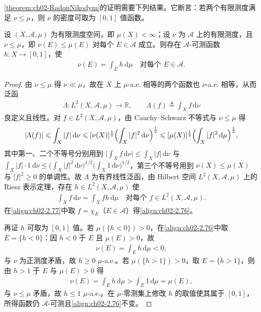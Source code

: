 \documentclass[../../main.tex]{subfiles}%
\begin{document}
\cref{theorem:ch02-RadonNikodym}的证明需要下列结果。它断言：若两个有限测度满足 $\nu\leqslant\mu$，则 $\nu$ 的密度可取为 $[0,1]$ 值函数。

\begin{lemma}\label{lemma:ch02-vonNeumann}
设 $(X,\mathscr A,\mu)$ 为有限测度空间，即 $\mu(X)<\infty$；设 $\nu$ 为 $\mathscr A$ 上的有限测度，且 $\nu\leqslant\mu$，即 $\nu(E)\leqslant\mu(E)$ 对每个 $E\in\mathscr A$ 成立。则存在 $\mathscr A$-可测函数 $h:X\to[0,1]$，使
\begin{align}
\nu(E)=\int_Eh\,\mathrm{d}\mu\quad\text{对每个 }E\in\mathscr A. \label{align:ch02-2.76}
\end{align}
\end{lemma}

\begin{proof}
由 $\nu\leqslant\mu$ 得 $\nu\ll\mu$，故在 $X$ 上 $\mu$-a.e. 相等的两个函数也 $\nu$-a.e. 相等，从而泛函
\begin{align*}
\Lambda:L^2(X,\mathscr A,\mu)\to\mathbb R,\qquad\Lambda(f)\triangleq\int_Xf\,\mathrm{d}\nu
\end{align*}
良定义且线性。对 $f\in L^2(X,\mathscr A,\mu)$，由 Cauchy--Schwarz 不等式与 $\nu\leqslant\mu$ 得
\begin{align*}
|\Lambda(f)|\leqslant\int_X|f|\,\mathrm{d}\nu\leqslant[\nu(X)]^{\frac12}\Bigl(\int_X|f|^2\,\mathrm{d}\nu\Bigr)^{\frac12}\leqslant[\mu(X)]^{\frac12}\Bigl(\int_X|f|^2\,\mathrm{d}\mu\Bigr)^{\frac12},
\end{align*}
其中第一、二个不等号分别用到 $\bigl|\int_Xf\,\mathrm{d}\nu\bigr|\leqslant\int_X|f|\,\mathrm{d}\nu$ 与 $\int_X|f|\cdot1\,\mathrm{d}\nu\leqslant\bigl(\int_X|f|^2\,\mathrm{d}\nu\bigr)^{1/2}\bigl(\int_X1\,\mathrm{d}\nu\bigr)^{1/2}$，第三个不等号用到 $\nu(X)\leqslant\mu(X)$ 与 $|f|^2\geqslant0$ 的单调性。故 $\Lambda$ 为有界线性泛函，由 Hilbert 空间 $L^2(X,\mathscr A,\mu)$ 上的 Riesz 表示定理，存在 $h\in L^2(X,\mathscr A,\mu)$ 使
\begin{align}
\int_Xf\,\mathrm{d}\nu=\int_Xfh\,\mathrm{d}\mu\quad\text{对每个 }f\in L^2(X,\mathscr A,\mu). \label{align:ch02-2.77}
\end{align}
在\eqref{align:ch02-2.77}中取 $f=\chi_E$（$E\in\mathscr A$）得\eqref{align:ch02-2.76}。

再证 $h$ 可取为 $[0,1]$ 值。若 $\mu(\{h<0\})>0$，在\eqref{align:ch02-2.76}中取 $E=\{h<0\}$：因 $h<0$ 于 $E$ 且 $\mu(E)>0$，故
\begin{align*}
\nu(E)=\int_Eh\,\mathrm{d}\mu<0,
\end{align*}
与 $\nu$ 为正测度矛盾，故 $h\geqslant0$ $\mu$-a.e.。若 $\mu(\{h>1\})>0$，取 $E=\{h>1\}$，则由 $h>1$ 于 $E$ 与 $\mu(E)>0$ 得
\begin{align*}
\nu(E)=\int_Eh\,\mathrm{d}\mu>\int_E1\,\mathrm{d}\mu=\mu(E),
\end{align*}
与 $\nu\leqslant\mu$ 矛盾，故 $h\leqslant1$ $\mu$-a.e.。在 $\mu$-零测集上修改 $h$ 的取值使其属于 $[0,1]$，所得函数仍 $\mathscr A$-可测且\eqref{align:ch02-2.76}不变。
\end{proof}
\end{document}
